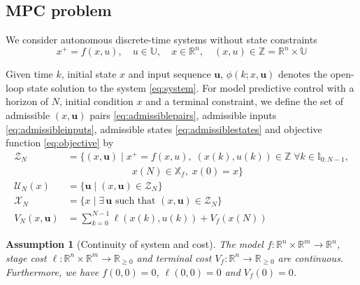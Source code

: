 \documentclass{article}
\newtheorem{assumption}{Assumption}
\begin{document}
\subsection{MPC problem}
\label{sec:mpc}
We consider autonomous discrete-time systems without state constraints
\begin{equation}
\label{eq:system}
x^+=f(x,u), \quad u \in \mathbb{U}, \quad x \in \mathbb{R}^n, \quad
(x,u) \in \mathbb{Z} = \mathbb{R}^n \times \mathbb{U} 
\end{equation}
\begin{comment}
The state and input are 
subject to the constraints
\begin{equation*}
(x,u) \in \mathbb{X} \times \mathbb{U}
\end{equation*}
\end{comment}
Given time $k$, initial state $x$ and input sequence $\mathbf{u}$, $\phi(k;x,\mathbf{u})$ denotes 
the open-loop state solution to the system \eqref{eq:system}.
For model predictive control with a horizon of $N$, initial condition $x$ 
and a terminal constraint, we define the set of admissible 
$(x,\mathbf{u})$ pairs \eqref{eq:admissiblepairs}, admissible inputs
\eqref{eq:admissibleinputs}, admissible states
\eqref{eq:admissiblestates} and objective function \eqref{eq:objective} by
\begin{align}
\label{eq:admissiblepairs}
\mathcal{Z}_N &= \{ (x,\mathbf{u}) \mid
x^+=f(x,u), \; (x(k),u(k)) \in \mathbb{Z} \; \forall k \in \mathbb{I}_{0:N-1}, \nonumber \\
              &\phantom{= \{ (x,\mathbf{u}) \mid x} x(N) \in \mathbb{X}_f, \; x(0)=x \} \\
\label{eq:admissibleinputs}
\mathcal{U}_N(x) &= \{\mathbf{u} \mid (x,\mathbf{u}) \in \mathcal{Z}_N \}
\\
\label{eq:admissiblestates}
\mathcal{X}_N &= \{x \mid 
\exists \, \mathbf{u} \text{ such that  } (x,\mathbf{u}) \in \mathcal{Z}_N \}
\\
\label{eq:objective}
 V_N ( x, \mathbf{u} ) &= \sum_{k=0}^{N-1} \ell ( x(k),u(k) ) + V_f(x(N))
\end{align}
\begin{assumption}[Continuity of system and cost]
\label{as:continuity}
The model $f:\mathbb{R}^n \times \mathbb{R}^m \rightarrow \mathbb{R}^n$, 
stage cost $\ell: \mathbb{R}^n \times \mathbb{R}^m \rightarrow \mathbb{R}_
{\geq 0}$ and terminal cost $V_f:\mathbb{R}^n \rightarrow \mathbb{R}_{\geq 0}$
are continuous. Furthermore, we have $f(0,0) = 0$, $\ell(0,0)=0$
and $V_f(0) = 0$.
\end{assumption}
\end{document}
